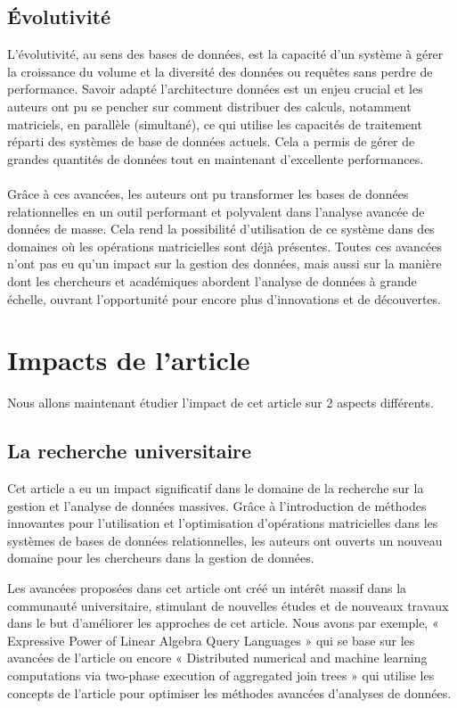 \documentclass[a4paper, 12pt]{article}
\begin{document}
\subsection{Évolutivité}
L’évolutivité, au sens des bases de données, est la capacité d'un système à gérer la croissance du volume et la diversité des données ou requêtes sans perdre de performance. Savoir adapté l'architecture données est un enjeu crucial et les auteurs ont pu se pencher sur comment distribuer des calculs, notamment matriciels, en parallèle (simultané), ce qui utilise les capacités de traitement réparti des systèmes de base de données actuels. Cela a permis de gérer de grandes quantités de données tout en maintenant d'excellente performances.

\paragraph{}
Grâce à ces avancées, les auteurs ont pu transformer les bases de données relationnelles en un outil performant et polyvalent dans l'analyse avancée de données de masse. Cela rend la possibilité d'utilisation de ce système dans des domaines où les opérations matricielles sont déjà présentes. Toutes ces avancées n'ont pas eu qu'un impact sur la gestion des données, mais aussi sur la manière dont les chercheurs et académiques abordent l'analyse de données à grande échelle, ouvrant l'opportunité pour encore plus d'innovations et de découvertes.

\clearpage 
\section{Impacts de l'article}

Nous allons maintenant étudier l’impact de cet article sur 2 aspects différents. 

\subsection{La recherche universitaire}

Cet article a eu un impact significatif dans le domaine de la recherche sur la gestion et l'analyse de données massives. Grâce à l'introduction de méthodes innovantes pour l'utilisation et l'optimisation d'opérations matricielles dans les systèmes de bases de données relationnelles, les auteurs ont ouverts un nouveau domaine pour les chercheurs dans la gestion de données.

Les avancées proposées dans cet article ont créé un intérêt massif dans la communauté universitaire, stimulant de nouvelles études et de nouveaux travaux dans le but d'améliorer les approches de cet article. Nous avons par exemple, « Expressive Power of Linear Algebra Query Languages » \cite{10.1145/3452021.3458314} qui se base sur les avancées de l’article ou encore « Distributed numerical and machine learning computations via two-phase execution of aggregated join trees »\cite{10.14778/3450980.3450991} qui utilise les concepts de l’article pour optimiser les méthodes avancées d’analyses de données.
\end{document}
